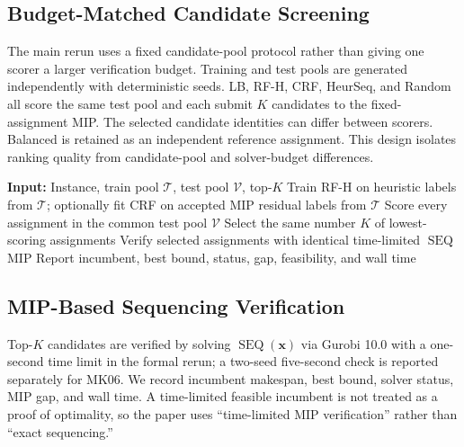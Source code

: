 \documentclass[12pt]{article}
\begin{document}
\subsection{Budget-Matched Candidate Screening}
The main rerun uses a fixed candidate-pool protocol rather than giving one scorer a larger verification budget. Training and test pools are generated independently with deterministic seeds. LB, RF-H, CRF, HeurSeq, and Random all score the same test pool and each submit $K$ candidates to the fixed-assignment MIP. The selected candidate identities can differ between scorers. Balanced is retained as an independent reference assignment. This design isolates ranking quality from candidate-pool and solver-budget differences.

\begin{algorithm}[htbp]\caption{Budget-Matched Candidate Screening}\label{alg:beam}
\begin{algorithmic}[1]
\State \textbf{Input:} Instance, train pool $\mathcal{T}$, test pool $\mathcal{V}$, top-$K$
\State Train RF-H on heuristic labels from $\mathcal{T}$; optionally fit CRF on accepted MIP residual labels from $\mathcal{T}$
    \State Score every assignment in the common test pool $\mathcal{V}$
    \State Select the same number $K$ of lowest-scoring assignments
    \State Verify selected assignments with identical time-limited $\operatorname{SEQ}$ MIP
\EndFor
\State Report incumbent, best bound, status, gap, feasibility, and wall time
\end{algorithmic}
\end{algorithm}

\subsection{MIP-Based Sequencing Verification}
Top-$K$ candidates are verified by solving $\operatorname{SEQ}(\mathbf{x})$ via Gurobi 10.0 with a one-second time limit in the formal rerun; a two-seed five-second check is reported separately for MK06. We record incumbent makespan, best bound, solver status, MIP gap, and wall time. A time-limited feasible incumbent is not treated as a proof of optimality, so the paper uses ``time-limited MIP verification'' rather than ``exact sequencing.''
\end{document}
